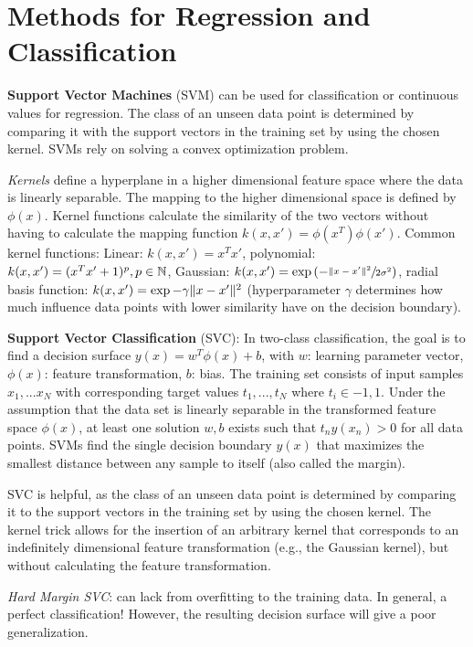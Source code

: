 \section*{Methods for Regression and Classification}

\textbf{Support Vector Machines} (SVM) 
can be used for classification or continuous values for regression. 
The class of an unseen data point is determined by comparing it with the support vectors in the training set by using the chosen kernel.
SVMs rely on solving a convex optimization problem.

\textit{Kernels}
define a hyperplane in a higher dimensional feature space where the data is linearly separable. 
The mapping to the higher dimensional space is defined by $\phi(x)$. 
Kernel functions calculate the similarity of the two vectors without having to calculate the mapping function $k(x,x')=\phi(x^T)\phi(x')$.
Common kernel functions:
Linear: $k(x,x') = x^T x'$, polynomial: $k(x,x')=(x^T x' + 1)^p, p\in\mathbb{N}$, Gaussian: $k(x,x')=\exp{(-\sfrac{\lVert x-x' \rVert^2}{2\sigma^2})}$, radial basis function: $k(x,x')=\exp{-\gamma\lVert x-x' \rVert^2}$ (hyperparameter $\gamma$ determines how much influence data points with lower similarity have on the decision boundary).

\textbf{Support Vector Classification} (SVC):
In two-class classification, the goal is to find a decision surface $y(x)=w^T\phi(x)+b$, with $w$: learning parameter vector, $\phi(x)$: feature transformation, $b$: bias.
The training set consists of input samples $x_1,...x_N$ with corresponding target values $t_1,...,t_N$ where $t_i\in {-1,1}$.
Under the assumption that the data set is linearly separable in the transformed feature space $\phi(x)$, at least one solution $w,b$ exists such that $t_n y(x_n)>0$ for all data points.
SVMs find the single decision boundary $y(x)$ that maximizes the smallest distance between any sample to itself (also called the margin).

SVC is helpful, as the class of an unseen data point is determined by comparing it to the support vectors in the training set by using the chosen kernel.
The kernel trick allows for the insertion of an arbitrary kernel that corresponds to an indefinitely dimensional feature transformation (e.g., the Gaussian kernel), but without calculating the feature transformation.

\textit{Hard Margin SVC}: can lack from overfitting to the training data. In general, a perfect classification!
However, the resulting decision surface will give a poor generalization.

